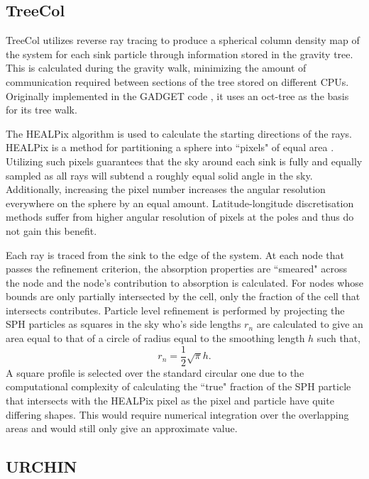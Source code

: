 \subsection{TreeCol}
\label{sec:healpix}
TreeCol \citep{treecol} utilizes reverse ray tracing to produce a spherical column density map of the system for each sink particle  through information stored in the gravity tree. This is calculated during the gravity walk, minimizing the amount of communication required between sections of the tree stored on different CPUs. Originally implemented in the GADGET code \citep{gadget}, it uses an oct-tree as the basis for its tree walk.

The HEALPix algorithm is used to calculate the starting directions of the rays. HEALPix is a method for partitioning a sphere into ``pixels" of equal area \citep{healpix}. Utilizing such pixels guarantees that the sky around each sink is fully and equally sampled as all rays will subtend a roughly equal solid angle in the sky. Additionally, increasing the pixel number increases the angular resolution everywhere on the sphere by an equal amount. Latitude-longitude discretisation methods suffer from higher angular resolution of pixels at the poles and thus do not gain this benefit.

Each ray is traced from the sink to the edge of the system. At each node that passes the refinement criterion, the absorption properties are ``smeared" across the node and the node's contribution to absorption is calculated. For nodes whose bounds are only partially intersected by the cell, only the fraction of the cell that intersects contributes. Particle level refinement is performed by projecting the SPH particles as squares in the sky who's side lengths $r_n$ are calculated to give an area equal to that of a circle of radius equal to the smoothing length $h$ such that,
\begin{equation}
    r_n = \frac{1}{2} \sqrt{\pi}h.
\end{equation}
A square profile is selected over the standard circular one due to the computational complexity of calculating the ``true" fraction of the SPH particle that intersects with the HEALPix pixel as the pixel and particle have quite differing shapes. This would require numerical integration over the overlapping areas and would still only give an approximate value.

\subsection{URCHIN}


